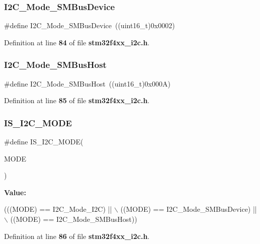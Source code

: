 \subsubsection{I2\+C\+\_\+\+Mode\+\_\+\+S\+M\+Bus\+Device}
{\footnotesize\ttfamily \#define I2\+C\+\_\+\+Mode\+\_\+\+S\+M\+Bus\+Device~((uint16\+\_\+t)0x0002)}



Definition at line \textbf{ 84} of file \textbf{ stm32f4xx\+\_\+i2c.\+h}.

\mbox{\label{group__I2C__mode_gacfd37619c8d91dea5dec2921840acede}} 
\subsubsection{I2\+C\+\_\+\+Mode\+\_\+\+S\+M\+Bus\+Host}
{\footnotesize\ttfamily \#define I2\+C\+\_\+\+Mode\+\_\+\+S\+M\+Bus\+Host~((uint16\+\_\+t)0x000\+A)}



Definition at line \textbf{ 85} of file \textbf{ stm32f4xx\+\_\+i2c.\+h}.

\mbox{\label{group__I2C__mode_ga58464e1fe94a79bab721137a544baf79}} 
\subsubsection{I\+S\+\_\+\+I2\+C\+\_\+\+M\+O\+DE}
{\footnotesize\ttfamily \#define I\+S\+\_\+\+I2\+C\+\_\+\+M\+O\+DE(\begin{DoxyParamCaption}\item[{}]{M\+O\+DE }\end{DoxyParamCaption})}

{\bfseries Value\+:}
\begin{DoxyCode}
(((MODE) == I2C_Mode_I2C) || \(\backslash\)
                           ((MODE) == I2C_Mode_SMBusDevice) || \(\backslash\)
                           ((MODE) == I2C_Mode_SMBusHost))
\end{DoxyCode}


Definition at line \textbf{ 86} of file \textbf{ stm32f4xx\+\_\+i2c.\+h}.

